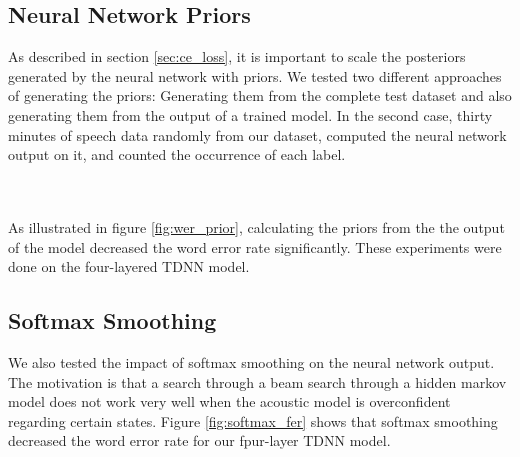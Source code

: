 \subsection{Neural Network Priors}
As described in section \ref{sec:ce_loss}, it is important to scale the posteriors generated by the neural network with priors. We tested two different approaches of generating the priors: Generating them from the complete test dataset and also generating them from the output of a trained model. In the second case, thirty minutes of speech data randomly from our dataset, computed the neural network output on it, and counted the occurrence of each label. \\ \\
\begin{minipage}{\linewidth}
	\centering
	\label{fig:wer_priors}
\end{minipage} 
\\
As illustrated in figure \ref{fig:wer_prior}, calculating the priors from the the output of the model decreased the word error rate significantly. These experiments were done on the four-layered TDNN model. 
\subsection{Softmax Smoothing}
We also tested the impact of softmax smoothing on the neural network output. The motivation is that a search through a beam search through a hidden markov model does not work very well when the acoustic model is overconfident regarding certain states. Figure \ref{fig:softmax_fer} shows that softmax smoothing decreased the word error rate for our fpur-layer TDNN model. \\ \\
\begin{minipage}{\linewidth}
	\label{fig:softmax_fer}
\end{minipage} \\ \\


